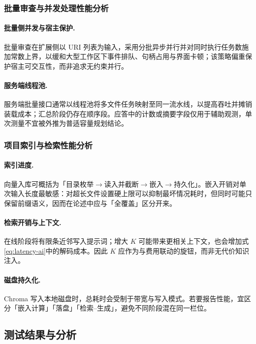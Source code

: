 \subsubsection{批量审查与并发处理性能分析}

\paragraph{批量侧并发与宿主保护.}
批量审查在扩展侧以 URI 列表为输入，采用分批异步并行并对同时执行任务数施加常数上界，以缓和大型工作区下事件排队、句柄占用与界面卡顿；该策略偏重保护宿主可交互性，而非追求无约束并行。

\paragraph{服务端线程池.}
服务端批量接口通常以线程池将多文件任务映射至同一流水线，以提高吞吐并摊销装载成本；汇总阶段仍存在顺序段。应答中的计数或摘要字段仅用于辅助观测，单次测量不宜被外推为普适容量规划结论。

\subsubsection{项目索引与检索性能分析}

\paragraph{索引进度.}
向量入库可概括为「目录枚举\(\rightarrow\)读入并截断\(\rightarrow\)嵌入\(\rightarrow\)持久化」。嵌入开销对单次输入长度最敏感：对超长文件设置硬上限可以抑制最坏情况耗时，但同时可能只保留前缀语义，因而在论述中应与「全覆盖」区分开来。

\paragraph{检索开销与上下文.}
在线阶段将有限条近邻写入提示词；增大 \(K\) 可能带来更相关上下文，也会增加式\eqref{eq:latency-ai}中的解码成本\cite{lewis2020retrieval}。因此 \(K\) 应作为与费用联动的旋钮，而非无代价知识注入。

\paragraph{磁盘持久化.}
Chroma 写入本地磁盘时，总耗时会受制于带宽与写入模式。若要报告性能，宜区分「嵌入计算」「落盘」「检索–生成」，避免不同阶段混在同一栏位。

\subsection{测试结果与分析}
\label{subsec:test-summary}

